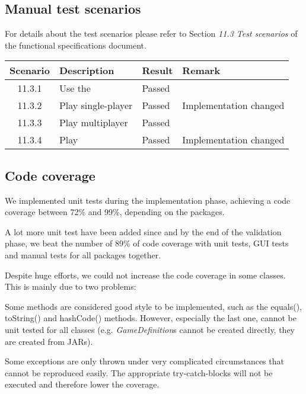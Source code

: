 \subsection{Manual test scenarios}

For details about the test scenarios please refer to Section \emph{11.3 Test scenarios} of the functional specifications document.\par

\begin{tabular}{clll}

\hline
	\textbf{Scenario} & \textbf{Description} & \textbf{Result} & \textbf{Remark} \\
	\hline
	11.3.1 & Use the \gameexplorer & Passed & \\
	11.3.2 & Play \graphcoloring single-player & Passed & Implementation changed \footnotemark \\
	11.3.3 & Play \graphcoloring multiplayer & Passed & \\
	11.3.4 & Play \twixt & Passed & Implementation changed \footnotemark \\
	\hline
\end{tabular}


\pagebreak
\subsection{Code coverage}
\label{section:code-coverage}
We implemented unit tests during the implementation phase, achieving a code coverage between 72\% and 99\%, depending on the packages.\par
A lot more unit test have been added since and by the end of the validation phase, we beat the number of 89\% of code coverage with unit tests, GUI tests and manual tests for all packages together.\par
Despite huge efforts, we could not increase the code coverage in some classes. This is mainly due to two problems:\par
Some methods are considered good style to be implemented, such as the equals(), toString() and hashCode() methods. However, especially the last one, cannot be unit tested for all classes (e.g. \emph{GameDefinition}s cannot be created directly, they are created from JARs).\par
Some exceptions are only thrown under very complicated circumstances that cannot be reproduced easily. The appropriate try-catch-blocks will not be executed and therefore lower the coverage.\par

